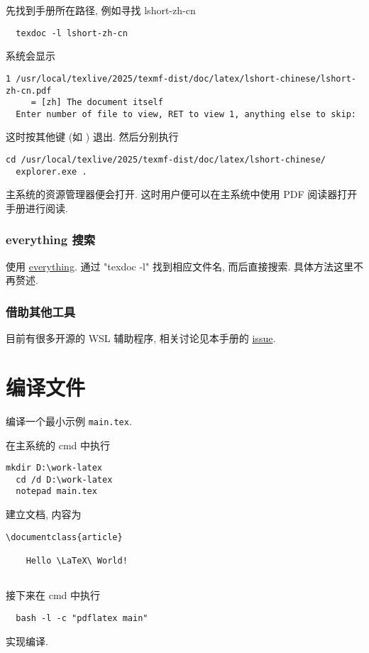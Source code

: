 先找到手册所在路径,
例如寻找 \textsf{lshort-zh-cn}
\begin{lstlisting}
  texdoc -l lshort-zh-cn
\end{lstlisting}
系统会显示
\begin{lstlisting}[language = {}]
   1 /usr/local/texlive/2025/texmf-dist/doc/latex/lshort-chinese/lshort-zh-cn.pdf
     = [zh] The document itself
  Enter number of file to view, RET to view 1, anything else to skip:
\end{lstlisting}
这时按其他键 (如 ) 退出.
然后分别执行
\begin{lstlisting}[language = {}]
  cd /usr/local/texlive/2025/texmf-dist/doc/latex/lshort-chinese/
  explorer.exe .
\end{lstlisting}
主系统的资源管理器便会打开.
这时用户便可以在主系统中使用 PDF 阅读器打开手册进行阅读.

\subsubsection{everything 搜索}

使用 \href{https://www.voidtools.com/zh-cn/}{everything}.
通过 "texdoc -l" 找到相应文件名,
而后直接搜索.
具体方法这里不再赘述.

\subsubsection{借助其他工具}

目前有很多开源的 WSL 辅助程序,
相关讨论见本手册的 \href{https://github.com/OsbertWang/install-latex-guide-zh-cn/issues/13}{issue}.

\section{编译文件}

编译一个最小示例 \texttt{main.tex}.

在主系统的 \textsf{cmd} 中执行
\begin{lstlisting}[deletekeywords = tex]
  mkdir D:\work-latex
  cd /d D:\work-latex
  notepad main.tex
\end{lstlisting}
建立文档,
内容为
\begin{lstlisting}[language = mwe]
  \documentclass{article}
  
    Hello \LaTeX\ World!
  
\end{lstlisting}
接下来在 \textsf{cmd} 中执行
\begin{lstlisting}
  bash -l -c "pdflatex main"
\end{lstlisting}
实现编译.

